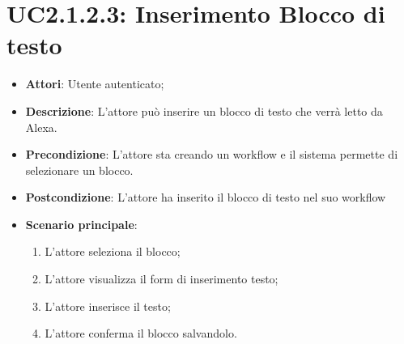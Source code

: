 \section{UC2.1.2.3: Inserimento Blocco di testo}
\label{UC2.1.2.3}
\begin{itemize}
	\item \textbf{Attori}: Utente autenticato;
	\item \textbf{Descrizione}: L'attore può inserire un blocco di testo che verrà letto da Alexa.
	\item \textbf{Precondizione}: L'attore sta creando un workflow e il sistema permette di selezionare un blocco.
	\item \textbf{Postcondizione}: L'attore ha inserito il blocco di testo nel suo workflow
	\item \textbf{Scenario principale}:
	\begin{enumerate} \item L'attore seleziona il blocco; \item L'attore visualizza il form di inserimento testo; \item  L'attore inserisce il testo; \item L'attore conferma il blocco salvandolo.\end{enumerate}
\end{itemize}

